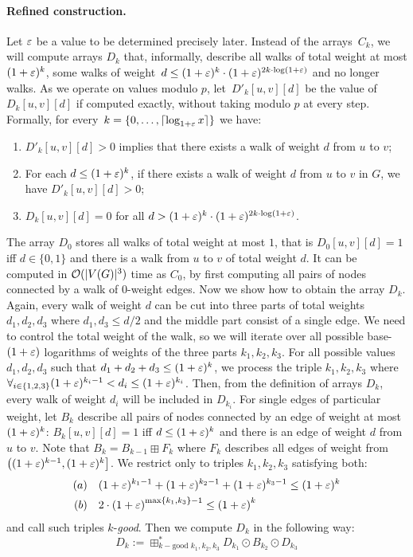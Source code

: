 \paragraph{Refined construction.}
Let $\varepsilon$ be a value to be determined precisely later.
Instead of the arrays~$C_k$, we will compute arrays $D_k$ that, informally, describe all walks of total weight at most $(1+\varepsilon)^k$, some walks of weight~$d \le (1+\varepsilon)^k\cdot (1+\varepsilon)^{2k\cdot \log(1+\varepsilon)}$ and no longer walks. 
As we operate on values modulo $p$, let~$D'_k[u,v][d]$ be the value of~$D_k[u,v][d]$ if computed exactly, without taking modulo $p$ at every step.
Formally, for every~$k=\{0,\ldots, \lceil \log_{1+\varepsilon} x \rceil\}$ we have:
 \begin{enumerate}
  \item $D'_k[u,v][d]>0$ implies that there exists a walk of weight $d$ from $u$ to $v$;
  \item For each $d\leq (1+\varepsilon)^k$, if there exists a walk of weight $d$ from $u$ to $v$ in $G$, we have $D'_k[u,v][d]>0$;
  \item $D_k[u,v][d]=0$ for all $d>(1+\varepsilon)^k\cdot (1+\varepsilon)^{2k\cdot \log(1+\varepsilon)}$.
\end{enumerate}
\noindent

The array $D_0$ stores all walks of total weight at most $1$, that is $D_0[u,v][d]=1$ iff $d\in\{0,1\}$ and there is a walk from $u$ to $v$ of total weight $d$.
It can be computed in $\mathcal{O}(|V(G)|^3)$ time as $C_0$, by first computing all pairs of nodes connected by a walk of 0-weight edges.
Now we show how to obtain the array $D_k$.
Again, every walk of weight $d$ can be cut into three parts of total weights $d_1,d_2,d_3$ where $d_1,d_3\leq d/2$ and the middle part consist of a single edge.
We need to control the total weight of the walk, so we will iterate over all possible base-$(1+\varepsilon)$ logarithms of weights of the three parts $k_1,k_2,k_3$.
For all possible values $d_1,d_2,d_3$ such that $d_1+d_2+d_3\leq (1+\varepsilon)^k$, we process the triple $k_1,k_2,k_3$ where $\forall_{i\in\{1,2,3\}} (1+\varepsilon)^{k_i-1} < d_i \leq (1+\varepsilon)^{k_i}$.
Then, from the definition of arrays $D_k$, every walk of weight $d_i$ will be included in $D_{k_i}$.
For single edges of particular weight, let $B_k$ describe all pairs of nodes connected by an edge of weight at most $(1+\varepsilon)^{k}$: $B_k[u,v][d]=1$ iff $d\leq (1+\varepsilon)^k$ and there is an edge of weight $d$ from $u$ to $v$.
Note that $B_k=B_{k-1}\boxplus F_k$ where $F_k$ describes all edges of weight from $\big( (1+\varepsilon)^{k-1},(1+\varepsilon)^k\big]$.
We restrict only to triples $k_1,k_2,k_3$ satisfying both:
 \begin{align}
 (a) \quad& (1+\varepsilon)^{k_1-1} + (1+\varepsilon)^{k_2-1} + (1+\varepsilon)^{k_3-1}  \le (1+\varepsilon)^k \label{eq:prop_k1,k2,k3}  \\
 (b) \quad& 2\cdot\left(1+\varepsilon\right)^{\max\{k_1,k_3\}-1} \le \left(1+\varepsilon\right)^k \label{eq:relation_k1_k}
\end{align}
\noindent
and call such triples $k$-\textit{good}. Then we compute $D_k$ in the following way:
\begin{equation}\label{eq:definition_d_k}
 D_k:=\boxplus^*_{k-\text{good }k_1,k_2,k_3} D_{k_1} \odot B_{k_2}\odot D_{k_3}
\end{equation}

